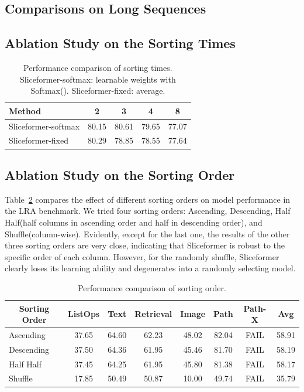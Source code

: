 \subsection{Comparisons on Long Sequences}

\subsection{Ablation Study on the Sorting Times}


\begin{table}[htbp]
  \centering
  \caption{Performance comparison of sorting times. Sliceformer-softmax: learnable weights with Softmax(). Sliceformer-fixed: average.}
    \begin{tabular}{l|cccc}
    \toprule
    Method & 2     & 3     & 4     & 8 \\
    \midrule
    Sliceformer-softmax & 80.15 & 80.61 & 79.65 & 77.07 \\
    Sliceformer-fixed & 80.29 & 78.85 & 78.55 & 77.64 \\
    \bottomrule
    \end{tabular}%
  \label{tab:addlabel}%
\end{table}%

\subsection{Ablation Study on the Sorting Order}

Table~\ref{tab:order} compares the effect of different sorting orders on model performance in the LRA benchmark. 
We tried four sorting orders: Ascending, Descending, Half Half(half columns in ascending order and half in descending order), and Shuffle(column-wise). 
Evidently, except for the last one, the results of the other three sorting orders are very close, indicating that Sliceformer is robust to the specific order of each column. 
However, for the randomly shuffle, Sliceformer clearly loses its learning ability and degenerates into a randomly selecting model.

\begin{table}[htbp]
  \centering
  \caption{Performance comparison of sorting order.}
    \begin{tabular}{l|cccccc|c}
    \toprule
    \multicolumn{1}{c|}{Sorting Order} & ListOps & Text  & Retrieval & Image & Path  & Path-X & Avg \\
    \midrule
    Ascending & 37.65 & 64.60 & 62.23 & 48.02 & 82.04 & FAIL  & 58.91 \\
    Descending & 37.50 & 64.36 & 61.95 & 45.46 & 81.70 & FAIL  & 58.19 \\
    Half  Half  & 37.45 & 64.25 & 61.95 & 45.80 & 81.38 & FAIL  & 58.17 \\
    Shuffle & 17.85 & 50.49 & 50.87 & 10.00 & 49.74 & FAIL  & 35.79 \\
    \bottomrule
    \end{tabular}%
  \label{tab:order}%
\end{table}%

